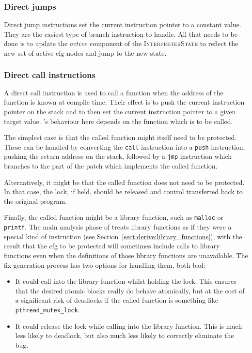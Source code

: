 \subsubsection{Direct jumps}

 Direct jump
instructions set the current instruction pointer to a constant value.
They are the easiest type of branch instruction to handle.  All that
needs to be done is to update the $\mathit{active}$ component of the
\textsc{InterpreterState} to reflect the new set of active \gls{cfg} nodes
and jump to the new state.

\subsubsection{Direct call instructions}

A direct call instruction is used to call a function when the address
of the function is known at compile time.  Their effect is to push the
current instruction pointer on the stack and to then set the current
instruction pointer to a given target value.  {\Implementation}'s
behaviour here depends on the function which is to be called.

The simplest case is that the called function might itself need to be
protected.  These can be handled by converting the \texttt{call}
instruction into a \texttt{push} instruction, pushing the return
address on the stack, followed by a \texttt{jmp} instruction which
branches to the part of the patch which implements the called
function.

Alternatively, it might be that the called function does not need to
be protected.  In that case, the lock, if held, should be released and
control transferred back to the original program.

Finally, the called function might be a library function, such as
\texttt{malloc} or \texttt{printf}.  The main analysis
phase of {\technique} treats library functions as if they were a
special kind of instruction (see
Section~\ref{sect:derive:library_functions}), with the result that the \gls{cfg} to be
protected will sometimes include calls to library functions even when
the definitions of those library functions are unavailable.  The fix
generation process has two options for handling them, both bad:

\begin{itemize}
\item It could call into the library function whilst holding the lock.
  This ensures that the desired atomic blocks really do behave
  atomically, but at the cost of a significant risk of deadlocks if
  the called function is something like \texttt{pthread\_mutex\_lock}.
\item It could release the lock while calling into the library
  function.  This is much less likely to deadlock, but also much
  less likely to correctly eliminate the bug.
\end{itemize}

